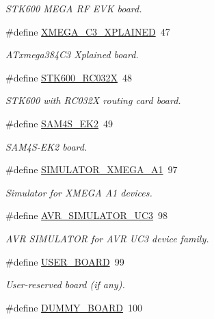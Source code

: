 \begin{DoxyCompactItemize}
\begin{DoxyCompactList}\small\item\em S\-T\-K600 M\-E\-G\-A R\-F E\-V\-K board. \end{DoxyCompactList}\item 
\#define \hyperlink{group__group__common__boards_ga8224cc63d7af89624b477011ff52ff91}{X\-M\-E\-G\-A\-\_\-\-C3\-\_\-\-X\-P\-L\-A\-I\-N\-E\-D}~47
\begin{DoxyCompactList}\small\item\em A\-Txmega384\-C3 Xplained board. \end{DoxyCompactList}\item 
\#define \hyperlink{group__group__common__boards_ga656cc8303b1e70eb2ed57a1931da2353}{S\-T\-K600\-\_\-\-R\-C032\-X}~48
\begin{DoxyCompactList}\small\item\em S\-T\-K600 with R\-C032\-X routing card board. \end{DoxyCompactList}\item 
\#define \hyperlink{group__group__common__boards_ga588503ce59af4ecd9eb92c589ce36f57}{S\-A\-M4\-S\-\_\-\-E\-K2}~49
\begin{DoxyCompactList}\small\item\em S\-A\-M4\-S-\/\-E\-K2 board. \end{DoxyCompactList}\item 
\#define \hyperlink{group__group__common__boards_ga1c9dfe8403ed817c13fc6031956b1635}{S\-I\-M\-U\-L\-A\-T\-O\-R\-\_\-\-X\-M\-E\-G\-A\-\_\-\-A1}~97
\begin{DoxyCompactList}\small\item\em Simulator for X\-M\-E\-G\-A A1 devices. \end{DoxyCompactList}\item 
\#define \hyperlink{group__group__common__boards_gad93cf08d9dfb95c3c2cfd1cf38c0f2e4}{A\-V\-R\-\_\-\-S\-I\-M\-U\-L\-A\-T\-O\-R\-\_\-\-U\-C3}~98
\begin{DoxyCompactList}\small\item\em A\-V\-R S\-I\-M\-U\-L\-A\-T\-O\-R for A\-V\-R U\-C3 device family. \end{DoxyCompactList}\item 
\#define \hyperlink{group__group__common__boards_ga6e6dffe821337dbaaa12bca06e8e5119}{U\-S\-E\-R\-\_\-\-B\-O\-A\-R\-D}~99
\begin{DoxyCompactList}\small\item\em User-\/reserved board (if any). \end{DoxyCompactList}\item 
\#define \hyperlink{group__group__common__boards_gac33d75ae101690822610338fdff2e95b}{D\-U\-M\-M\-Y\-\_\-\-B\-O\-A\-R\-D}~100
\end{DoxyCompactItemize}
